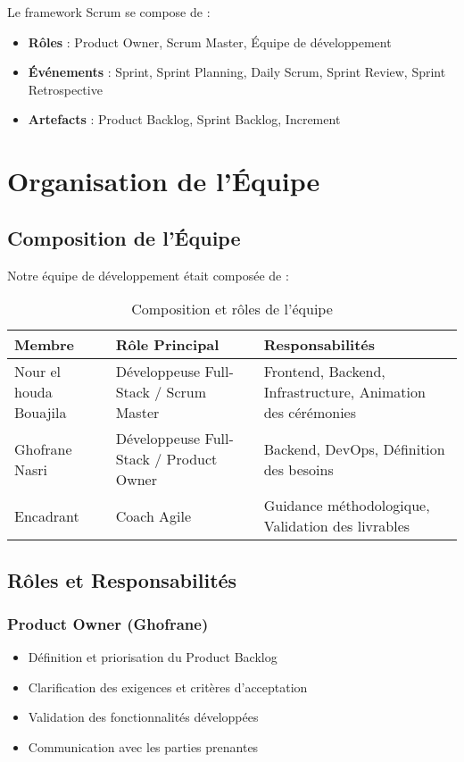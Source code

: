 Le framework Scrum se compose de :
\begin{itemize}
    \item \textbf{Rôles} : Product Owner, Scrum Master, Équipe de développement
    \item \textbf{Événements} : Sprint, Sprint Planning, Daily Scrum, Sprint Review, Sprint Retrospective
    \item \textbf{Artefacts} : Product Backlog, Sprint Backlog, Increment
\end{itemize}

\section{Organisation de l'Équipe}

\subsection{Composition de l'Équipe}

Notre équipe de développement était composée de :

\begin{table}[H]
    \centering
    \begin{tabularx}{\textwidth}{|l|X|X|}
        \hline
        \textbf{Membre} & \textbf{Rôle Principal} & \textbf{Responsabilités} \\
        \hline
        Nour el houda Bouajila & Développeuse Full-Stack / Scrum Master & Frontend, Backend, Infrastructure, Animation des cérémonies \\
        \hline
        Ghofrane Nasri & Développeuse Full-Stack / Product Owner & Backend, DevOps, Définition des besoins \\
        \hline
        Encadrant & Coach Agile & Guidance méthodologique, Validation des livrables \\
        \hline
    \end{tabularx}
    \caption{Composition et rôles de l'équipe}
    \label{tab:team_composition}
\end{table}

\subsection{Rôles et Responsabilités}

\subsubsection{Product Owner (Ghofrane)}
\begin{itemize}
    \item Définition et priorisation du Product Backlog
    \item Clarification des exigences et critères d'acceptation
    \item Validation des fonctionnalités développées
    \item Communication avec les parties prenantes
\end{itemize}

